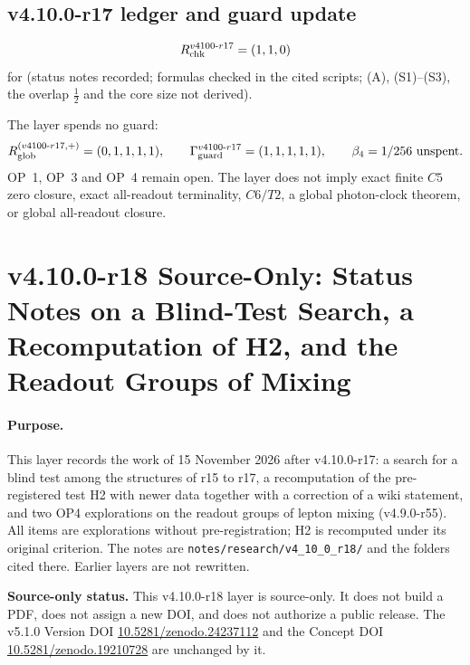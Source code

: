 \subsection*{v4.10.0-r17 ledger and guard update}
\label{subsec:v4100-r17-ledger-guard}

\[
R_{\rm chk}^{v4100\text{-}r17}=(1,1,0)
\]
for (status notes recorded; formulas checked in the cited scripts; (A), (S1)--(S3), the overlap \(\tfrac12\) and the core size not
derived).

The layer spends no guard:
\[
R_{\rm glob}^{(v4100\text{-}r17,+)}=(0,1,1,1,1),
\qquad
\Gamma_{\rm guard}^{v4100\text{-}r17}=(1,1,1,1,1),
\qquad
\beta_4=1/256\ \text{unspent}.
\]
OP~1, OP~3 and OP~4 remain open.  The layer does not imply exact finite \(C5\) zero closure, exact all-readout terminality,
\(C6/T2\), a global photon-clock theorem, or global all-readout closure.

\clearpage
\section*{v4.10.0-r18 Source-Only: Status Notes on a Blind-Test Search, a Recomputation of H2, and the Readout Groups of Mixing}
\label{sec:v4100-r18-blind-search-h2-mixing}

\paragraph{Purpose.}
This layer records the work of 15 November 2026 after v4.10.0-r17: a search for a blind test among the structures of r15 to r17,
a recomputation of the pre-registered test H2 with newer data together with a correction of a wiki statement, and two OP4
explorations on the readout groups of lepton mixing (v4.9.0-r55).  All items are explorations without pre-registration; H2 is
recomputed under its original criterion.  The notes are \texttt{notes/\allowbreak research/\allowbreak v4\_10\_0\_r18/} and the
folders cited there.  Earlier layers are not rewritten.

\noindent\textbf{Source-only status.}
This v4.10.0-r18 layer is source-only.  It does not build a PDF, does not assign a new DOI,
and does not authorize a public release.  The v5.1.0 Version DOI
\href{https://doi.org/10.5281/zenodo.24237112}{10.5281/zenodo.24237112} and the Concept DOI
\href{https://doi.org/10.5281/zenodo.19210728}{10.5281/zenodo.19210728} are unchanged by it.

